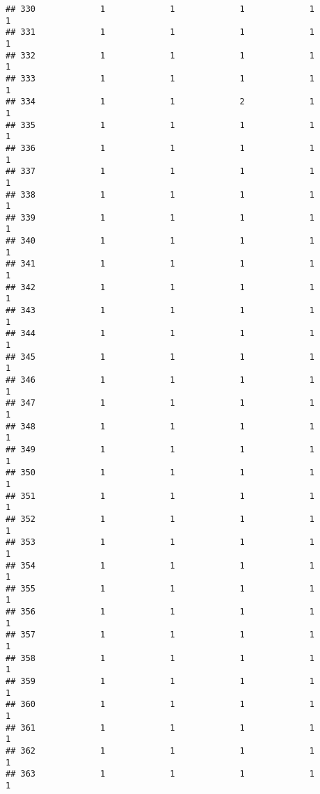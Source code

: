\documentclass[
]{article}
\begin{document}
\begin{verbatim}
## 330             1             1             1             1             1
## 331             1             1             1             1             1
## 332             1             1             1             1             1
## 333             1             1             1             1             1
## 334             1             1             2             1             1
## 335             1             1             1             1             1
## 336             1             1             1             1             1
## 337             1             1             1             1             1
## 338             1             1             1             1             1
## 339             1             1             1             1             1
## 340             1             1             1             1             1
## 341             1             1             1             1             1
## 342             1             1             1             1             1
## 343             1             1             1             1             1
## 344             1             1             1             1             1
## 345             1             1             1             1             1
## 346             1             1             1             1             1
## 347             1             1             1             1             1
## 348             1             1             1             1             1
## 349             1             1             1             1             1
## 350             1             1             1             1             1
## 351             1             1             1             1             1
## 352             1             1             1             1             1
## 353             1             1             1             1             1
## 354             1             1             1             1             1
## 355             1             1             1             1             1
## 356             1             1             1             1             1
## 357             1             1             1             1             1
## 358             1             1             1             1             1
## 359             1             1             1             1             1
## 360             1             1             1             1             1
## 361             1             1             1             1             1
## 362             1             1             1             1             1
## 363             1             1             1             1             1

\end{verbatim}
\end{document}
